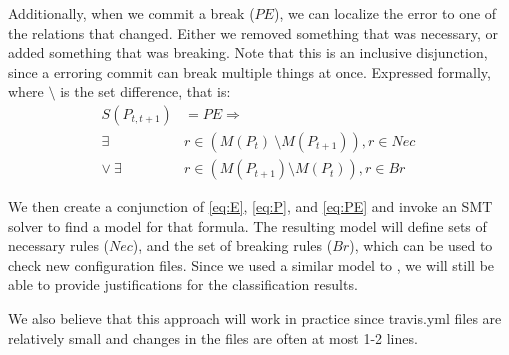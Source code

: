 Additionally, when we commit a break ($PE$), we can localize the error to one of the relations that changed.
Either we removed something that was necessary, or added something that was breaking.
Note that this is an inclusive disjunction, since a erroring commit can break multiple things at once.
Expressed formally, where $\setminus$ is the set difference, that is:
\begin{align}
  S(P_{t,t+1}) &= PE \Rightarrow \nonumber \\
  \exists& r \in (M(P_{t})\ \setminus M(P_{t+1})), r \in Nec\ \nonumber \\
  \lor \ \exists& r \in (M(P_{t+1}) \setminus M(P_{t})), r \in Br \label{eq:PE}
\end{align}

We then create a conjunction of \eqref{eq:E}, \eqref{eq:P}, and  \eqref{eq:PE} and invoke an SMT solver to find a model for that formula.
The resulting model will define sets of necessary rules ($Nec$), and the set of breaking rules ($Br$), which can be used to check new configuration files.
Since we used a similar model to \app, we will still be able to provide justifications for the classification results.

We also believe that this approach will work in practice since travis.yml files are relatively small and changes in the files are often at most 1-2 lines.

